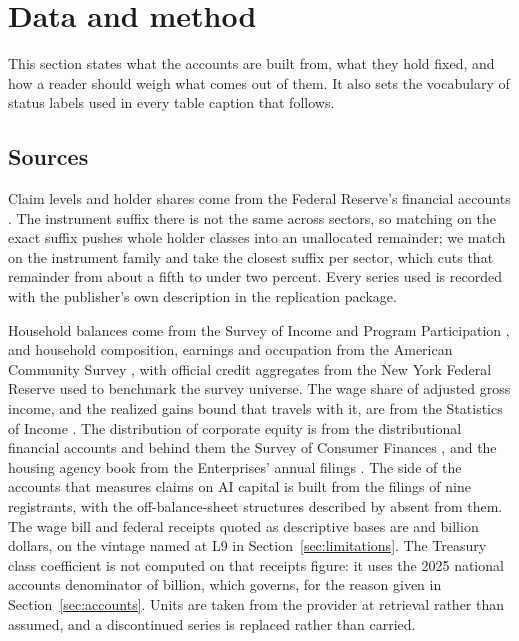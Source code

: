 \section{Data and method}
\label{sec:data}

This section states what the accounts are built from, what they hold fixed, and how a reader
should weigh what comes out of them. It also sets the vocabulary of status labels used in every
table caption that follows.

\subsection{Sources}

Claim levels and holder shares come from the Federal Reserve's financial accounts
\citep{FRBZ1}. The instrument suffix there is not the same across sectors, so matching on the
exact suffix pushes whole holder classes into an unallocated remainder; we match on the
instrument family and take the closest suffix per sector, which cuts that remainder from about a
fifth to under two percent. Every series used is recorded with the publisher's own description in
the replication package.

Household balances come from the Survey of Income and Program Participation \citep{CensusSIPP},
and household composition, earnings and occupation from the American Community Survey
\citep{CensusACS}, with official credit aggregates from the New York Federal Reserve
\citep{NYFedHHDC2026} used to benchmark the survey universe. The wage share of adjusted gross
income, and the realized gains bound that travels with it, are from the Statistics of Income
\citep{IRSSOI}. The distribution of corporate equity is from the distributional financial
accounts \citep{FRBDFA} and behind them the Survey of Consumer Finances \citep{FRBSCF}, and the
housing agency book from the Enterprises' annual filings
\citep{FannieMae10K2025,FreddieMac10K2025}. The side of the accounts that measures claims on AI
capital is built from the filings of nine registrants, with the off-balance-sheet structures
described by \citet{BIS2026} absent from them. The wage bill and federal receipts quoted as
descriptive bases are  and  billion
dollars, on the vintage named at L9 in Section~\ref{sec:limitations}. The Treasury class
coefficient is not computed on that receipts figure: it uses the 2025 national accounts
denominator of  billion, which governs, for the reason given in
Section~\ref{sec:accounts}. Units are taken from the
provider at retrieval rather than assumed, and a discontinued series is replaced rather than
carried.

